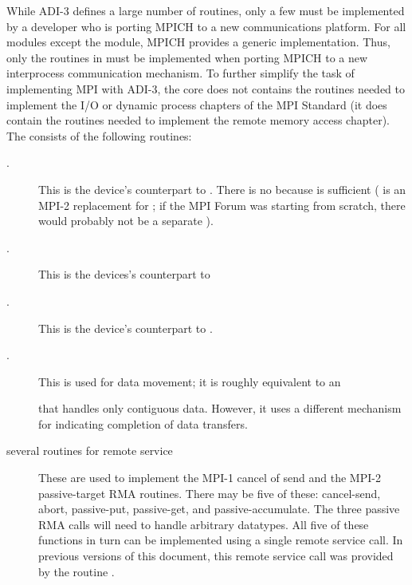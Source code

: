 \documentclass[dvipdfm]{article}
\begin{document}
While ADI-3 defines a large number of routines, only a few must be implemented
by a developer who is porting MPICH to a new communications platform.
For all modules except the  module, MPICH 
provides a generic implementation.  Thus, only the routines in
 must be implemented when porting MPICH to a new interprocess
communication mechanism.  To further simplify the task of implementing MPI
with ADI-3, the core does not contains the routines needed to implement the
I/O or dynamic process chapters of the MPI Standard (it does contain the
routines needed to implement the remote memory access chapter).  The
 consists of the following routines:  

\begin{description}
\item[.] This is the device's counterpart to
.  There is no  because
 is sufficient ( is an MPI-2
replacement for ; if the MPI Forum was starting from
scratch, there would probably not be a separate ).

\item[.] This is the devices's counterpart to

\item[.] This is the device's counterpart to .

\item[.] This is used for data movement; it is
roughly equivalent to an

 that handles only contiguous data.  However, it uses a
different mechanism for indicating completion of data transfers.

\item[several routines for remote service]These are used to implement
the MPI-1 cancel of send and the MPI-2 passive-target RMA routines.
There may be five of these: cancel-send, abort, passive-put,
passive-get, and passive-accumulate.  The three passive RMA calls will
need to handle arbitrary datatypes.  All five of these functions in
turn can be implemented using a single remote service call.  In
previous versions of this document, this remote service call was
provided by the routine .



\end{description}
\end{document}
